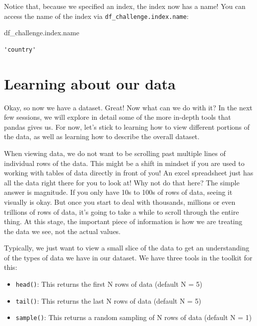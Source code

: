 \documentclass[
  letterpaper,
  DIV=11,
  numbers=noendperiod]{scrreprt}
\newenvironment{Shaded}{\begin{snugshade}}{\end{snugshade}}
\newcommand{\NormalTok}[1]{\textcolor[rgb]{0.00,0.23,0.31}{#1}}
\providecommand{\tightlist}{%
  \setlength{\itemsep}{0pt}\setlength{\parskip}{0pt}}\usepackage{longtable,booktabs,array}
\begin{document}
\begin{tcolorbox}
Notice that, because we specified an index, the index now has a name!
You can access the name of the index via
\texttt{df\_challenge.index.name}:

\begin{Shaded}
\begin{Highlighting}[]
\NormalTok{df\_challenge.index.name}
\end{Highlighting}
\end{Shaded}

\begin{verbatim}
'country'
\end{verbatim}

\end{tcolorbox}

\hypertarget{learning-about-our-data}{%
\section{Learning about our data}\label{learning-about-our-data}}

Okay, so now we have a dataset. Great! Now what can we do with it? In
the next few sessions, we will explore in detail some of the more
in-depth tools that pandas gives us. For now, let's stick to learning
how to view different portions of the data, as well as learning how to
describe the overall dataset.

When viewing data, we do not want to be scrolling past multiple lines of
individual rows of the data. This might be a shift in mindset if you are
used to working with tables of data directly in front of you! An excel
spreadsheet just has all the data right there for you to look at! Why
not do that here? The simple answer is magnitude. If you only have 10s
to 100s of rows of data, seeing it visually is okay. But once you start
to deal with thousands, millions or even trillions of rows of data, it's
going to take a while to scroll through the entire thing. At this stage,
the important piece of information is how we are treating the data we
see, not the actual values.

Typically, we just want to view a small slice of the data to get an
understanding of the types of data we have in our dataset. We have three
tools in the toolkit for this:

\begin{itemize}
\tightlist
\item
  \texttt{head()}: This returns the first N rows of data (default N = 5)
\item
  \texttt{tail()}: This returns the last N rows of data (default N = 5)
\item
  \texttt{sample()}: This returns a random sampling of N rows of data
  (default N = 1)
\end{itemize}
\end{document}
